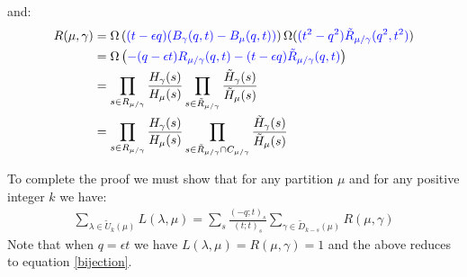 \documentclass[12pt,dvips]{amsart}
\begin{document}
\medskip
\noindent
and:
\begin{align*}
R(\mu, \gamma) &= \Omega \left ( {\color{blue}(t - \epsilon q) (B_\gamma(q,t) - B_\mu(q,t))} \right ) \Omega ( {\color{blue}(t^2 - q^2) \tilde{R}_{\mu / \gamma}(q^2,t^2)}) \\
&=\Omega \left ( {\color{blue}-(q - \epsilon t) R_{\mu / \gamma}(q,t) - (t - \epsilon q) \tilde{R}_{\mu / \gamma}(q,t)}  \right ) \\
&= \prod_{s \in R_{\mu / \gamma}} \frac{H_\gamma(s)}{H_\mu(s)} \prod_{s \in \tilde{R}_{\mu / \gamma}} \frac{\tilde{H}_\gamma(s)}{\tilde{H}_\mu(s)} \\
&= \prod_{s \in R_{\mu / \gamma}} \frac{H_\gamma(s)}{H_\mu(s)} \prod_{s \in \tilde{R}_{\mu / \gamma} \cap C_{\mu / \gamma}} \frac{\tilde{H}_\gamma(s)}{\tilde{H}_\mu(s)} 
\end{align*}


\medskip
\noindent
To complete the proof we must show that for any partition $\mu$ and for any positive integer $k$ we have:
\begin{align} \label{toprove}
\sum_{\lambda \in \tilde{U}_k(\mu)} L(\lambda, \mu) = \sum_s \frac{(-q;t)_s}{(t;t)_s} \sum_{\gamma \in \tilde{D}_{k-s}(\mu)} R(\mu, \gamma) 
\end{align}
Note that when $q = \epsilon t$ we have $L(\lambda, \mu) = R(\mu, \gamma) = 1$ and the above reduces to equation \eqref{bijection}.
\end{document}

